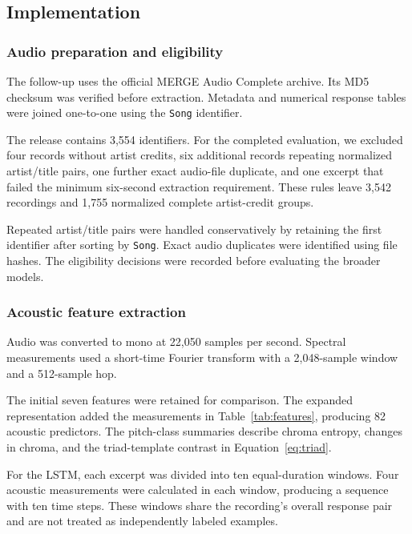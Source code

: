 \subsection{Implementation}
\label{sec:implementation}

\subsubsection{Audio preparation and eligibility}

The follow-up uses the official MERGE Audio Complete archive. Its MD5 checksum was verified before extraction. Metadata and numerical response tables were joined one-to-one using the \texttt{Song} identifier.

The release contains 3,554 identifiers. For the completed evaluation, we excluded four records without artist credits, six additional records repeating normalized artist/title pairs, one further exact audio-file duplicate, and one excerpt that failed the minimum six-second extraction requirement. These rules leave 3,542 recordings and 1,755 normalized complete artist-credit groups.

Repeated artist/title pairs were handled conservatively by retaining the first identifier after sorting by \texttt{Song}. Exact audio duplicates were identified using file hashes. The eligibility decisions were recorded before evaluating the broader models.

\subsubsection{Acoustic feature extraction}

Audio was converted to mono at 22,050 samples per second. Spectral measurements used a short-time Fourier transform with a 2,048-sample window and a 512-sample hop.

The initial seven features were retained for comparison. The expanded representation added the measurements in Table~\ref{tab:features}, producing 82 acoustic predictors. The pitch-class summaries describe chroma entropy, changes in chroma, and the triad-template contrast in Equation~\eqref{eq:triad}.

For the LSTM, each excerpt was divided into ten equal-duration windows. Four acoustic measurements were calculated in each window, producing a sequence with ten time steps. These windows share the recording's overall response pair and are not treated as independently labeled examples.

